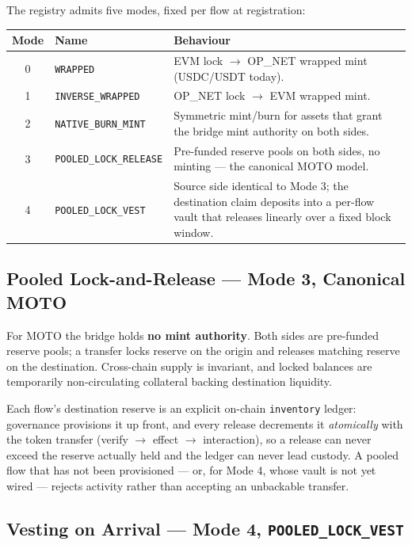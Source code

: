 \documentclass[11pt,a4paper]{article}
\begin{document}
The registry admits five modes, fixed per flow at registration:

\begin{center}
\renewcommand{\arraystretch}{1.25}
\begin{tabularx}{\textwidth}{@{}c l X@{}}
\toprule
\textbf{Mode} & \textbf{Name} & \textbf{Behaviour} \\
\midrule
0 & \texttt{WRAPPED} & EVM lock $\rightarrow$ OP\_NET wrapped mint (USDC/USDT today). \\
1 & \texttt{INVERSE\_WRAPPED} & OP\_NET lock $\rightarrow$ EVM wrapped mint. \\
2 & \texttt{NATIVE\_BURN\_MINT} & Symmetric mint/burn for assets that grant the bridge mint authority on both sides. \\
3 & \texttt{POOLED\_LOCK\_RELEASE} & Pre-funded reserve pools on both sides, no minting --- the canonical MOTO model. \\
4 & \texttt{POOLED\_LOCK\_VEST} & Source side identical to Mode 3; the destination claim deposits into a per-flow vault that releases linearly over a fixed block window. \\
\bottomrule
\end{tabularx}
\end{center}

\subsection{Pooled Lock-and-Release --- Mode 3, Canonical MOTO}

For MOTO the bridge holds \textbf{no mint authority}. Both sides are pre-funded reserve pools; a transfer locks reserve on the origin and releases matching reserve on the destination. Cross-chain supply is invariant, and locked balances are temporarily non-circulating collateral backing destination liquidity.

Each flow's destination reserve is an explicit on-chain \texttt{inventory} ledger: governance provisions it up front, and every release decrements it \emph{atomically} with the token transfer (verify $\rightarrow$ effect $\rightarrow$ interaction), so a release can never exceed the reserve actually held and the ledger can never lead custody. A pooled flow that has not been provisioned --- or, for Mode 4, whose vault is not yet wired --- rejects activity rather than accepting an unbackable transfer.

\subsection{Vesting on Arrival --- Mode 4, \texttt{POOLED\_LOCK\_VEST}}
\end{document}
